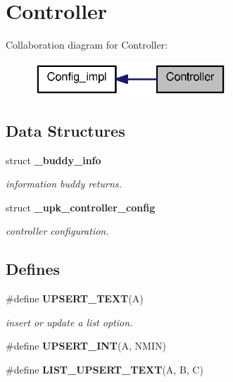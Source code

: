 \section{Controller}
\label{group__controller}
Collaboration diagram for Controller:\nopagebreak
\begin{figure}[H]
\begin{center}
\leavevmode
\includegraphics[width=206pt]{group__controller}
\end{center}
\end{figure}
\subsection*{Data Structures}
\begin{DoxyCompactItemize}
\item 
struct {\bf \_\-buddy\_\-info}
\begin{DoxyCompactList}\small\item\em information buddy returns. \end{DoxyCompactList}\item 
struct {\bf \_\-upk\_\-controller\_\-config}
\begin{DoxyCompactList}\small\item\em controller configuration. \end{DoxyCompactList}\end{DoxyCompactItemize}
\subsection*{Defines}
\begin{DoxyCompactItemize}
\item 
\#define {\bf UPSERT\_\-TEXT}(A)
\begin{DoxyCompactList}\small\item\em insert or update a list option. \end{DoxyCompactList}\item 
\#define {\bf UPSERT\_\-INT}(A, NMIN)
\item 
\#define {\bf LIST\_\-UPSERT\_\-TEXT}(A, B, C)
\end{DoxyCompactItemize}
